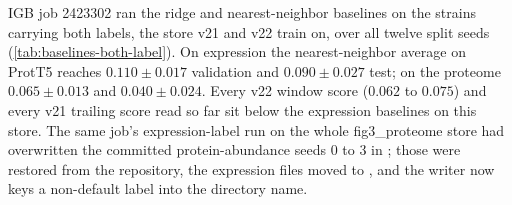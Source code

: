 

 IGB job 2423302 ran the ridge and
nearest-neighbor baselines on the strains carrying both labels, the store v21 and v22 train
on, over all twelve split seeds (\cref{tab:baselines-both-label}). On expression the
nearest-neighbor average on ProtT5 reaches $0.110 \pm 0.017$ validation and $0.090 \pm 0.027$
test; on the proteome $0.065 \pm 0.013$ and $0.040 \pm 0.024$. Every v22 window score
($0.062$ to $0.075$) and every v21 trailing score read so far sit below the expression
baselines on this store. The same job's expression-label run on the whole fig3\_proteome
store had overwritten the committed protein-abundance seeds 0 to 3 in
; those were restored from the repository, the
expression files moved to ,
and the writer now keys a non-default label into the directory name.


